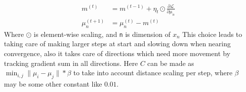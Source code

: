 \documentclass[a4paper,11pt]{article}
\begin{document}
\begin{mlsolution}
\begin{enumerate}
\begin{align*}
        m^{(t)} &= m^{(t-1)} + \eta_t \odot \frac{\partial \mathcal{L}}{\partial \mu_n} \\
        \mu_n^{(t+1)} &= \mu_n^{(t)} - m^{(t)}
    \end{align*}
    Where $\odot$ is element-wise scaling, and \texttt{n} is dimension of $x_n$
    This choice leads to taking care of making larger steps at start and slowing down when nearing convergence, also it takes care of directions which need more movement by tracking gradient sum in all directions. Here $C$ can be made as $\min_{i, j} \lVert \mu_i - \mu_j \rVert * \beta$ to take into account distance scaling per step, where $\beta$ may be some other constant like $0.01$.
\end{enumerate}

\end{mlsolution}
\end{document}
